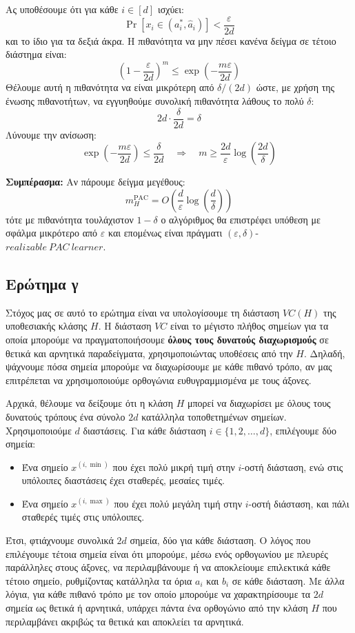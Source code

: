 \documentclass[12pt]{article}
\begin{document}
Ας υποθέσουμε ότι για κάθε $i \in [d]$ ισχύει:
\[
\Pr[x_i \in (a^*_i, \hat{a}_i)] < \frac{\varepsilon}{2d}
\]
και το ίδιο για τα δεξιά άκρα. Η πιθανότητα να μην πέσει κανένα δείγμα σε τέτοιο διάστημα είναι:
\[
\left(1 - \frac{\varepsilon}{2d} \right)^m \leq \exp\left( - \frac{m\varepsilon}{2d} \right)
\]
Θέλουμε αυτή η πιθανότητα να είναι μικρότερη από $\delta / (2d)$ ώστε, με χρήση της ένωσης πιθανοτήτων, να εγγυηθούμε συνολική πιθανότητα λάθους το πολύ $\delta$:
\[
2d \cdot \frac{\delta}{2d} = \delta
\]
Λύνουμε την ανίσωση:
\[
\exp\left( - \frac{m\varepsilon}{2d} \right) \leq \frac{\delta}{2d} \quad \Rightarrow \quad m \geq \frac{2d}{\varepsilon} \log\left( \frac{2d}{\delta} \right)
\]

\textbf{Συμπέρασμα:} Αν πάρουμε δείγμα μεγέθους:
\[
m_H^{\text{PAC}} = O\left( \frac{d}{\varepsilon} \log \left( \frac{d}{\delta} \right) \right)
\]
τότε με πιθανότητα τουλάχιστον $1 - \delta$ ο αλγόριθμος θα επιστρέφει υπόθεση με σφάλμα μικρότερο από $\varepsilon$ και επομένως είναι πράγματι $(\varepsilon, \delta)$-$realizable\ PAC\ learner$.

\vspace{1em}
\subsection*{Ερώτημα γ}

Στόχος μας σε αυτό το ερώτημα είναι να υπολογίσουμε τη διάσταση $VC(H)$ της υποθεσιακής κλάσης $H$. Η διάσταση $VC$ είναι το μέγιστο πλήθος σημείων για τα οποία μπορούμε να πραγματοποιήσουμε \textbf{όλους τους δυνατούς διαχωρισμούς} σε θετικά και αρνητικά παραδείγματα, χρησιμοποιώντας υποθέσεις από την $H$. Δηλαδή, ψάχνουμε πόσα σημεία μπορούμε να διαχωρίσουμε με κάθε πιθανό τρόπο, αν μας επιτρέπεται να χρησιμοποιούμε ορθογώνια ευθυγραμμισμένα με τους άξονες.

Αρχικά, θέλουμε να δείξουμε ότι η κλάση $H$ μπορεί να διαχωρίσει με όλους τους δυνατούς τρόπους ένα σύνολο $2d$ κατάλληλα τοποθετημένων σημείων. Χρησιμοποιούμε $d$ διαστάσεις. Για κάθε διάσταση $i \in \{1, 2, \dots, d\}$, επιλέγουμε δύο σημεία:
\begin{itemize}
  \item Ένα σημείο $x^{(i, \min)}$ που έχει πολύ μικρή τιμή στην $i$-οστή διάσταση, ενώ στις υπόλοιπες διαστάσεις έχει σταθερές, μεσαίες τιμές.
  \item Ένα σημείο $x^{(i, \max)}$ που έχει πολύ μεγάλη τιμή στην $i$-οστή διάσταση, και πάλι σταθερές τιμές στις υπόλοιπες.
\end{itemize}
Έτσι, φτιάχνουμε συνολικά $2d$ σημεία, δύο για κάθε διάσταση. Ο λόγος που επιλέγουμε τέτοια σημεία είναι ότι μπορούμε, μέσω ενός ορθογωνίου με πλευρές παράλληλες στους άξονες, να περιλαμβάνουμε ή να αποκλείουμε επιλεκτικά κάθε τέτοιο σημείο, ρυθμίζοντας κατάλληλα τα όρια $a_i$ και $b_i$ σε κάθε διάσταση. Με άλλα λόγια, για κάθε πιθανό τρόπο με τον οποίο μπορούμε να χαρακτηρίσουμε τα $2d$ σημεία ως θετικά ή αρνητικά, υπάρχει πάντα ένα ορθογώνιο από την κλάση $H$ που περιλαμβάνει ακριβώς τα θετικά και αποκλείει τα αρνητικά.
\end{document}
